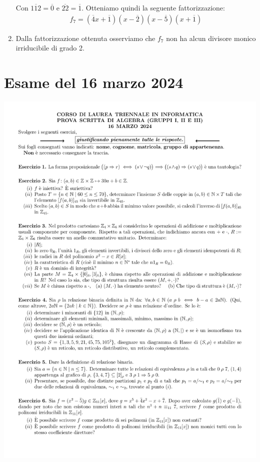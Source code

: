 \begin{enumerate}[label=(\textit{\roman*})]
	\begin{center}
	\end{center}
	Con $\overline{112}=\overline{0}$ e $\overline{22}=\overline{1}$. Otteniamo quindi la seguente fattorizzazione:
	\begin{align*}
		f_{7} = (\overline{4}x+\overline{1})(x-\overline{2})(x-\overline{5})(x+\overline{1})
	\end{align*}
	\item Dalla fattorizzazione ottenuta osserviamo che $f_{7}$ non ha alcun divisore monico irriducibile di grado 2.
\end{enumerate}
\vfill
\section{Esame del 16 marzo 2024}
\begin{center}
	\includegraphics[scale=.85]{pdf/24-03-16.pdf}
\end{center}
